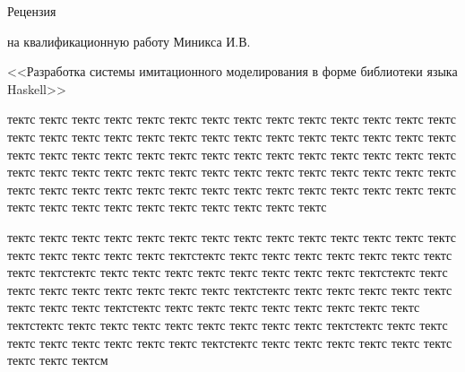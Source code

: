 \documentclass[utf8x]{article}
\begin{document}
\begin{center}
Рецензия

на квалификационную работу Миникса И.В.

<<Разработка системы имитационного моделирования в форме библиотеки языка Haskell>>

\end{center}

тектс тектс тектс тектс тектс тектс тектс тектс тектс тектс тектс тектс тектс тектс тектс тектс тектс тектс тектс тектс тектс тектс тектс тектс тектс тектс тектс тектс тектс тектс тектс тектс тектс тектс тектс тектс тектс тектс тектс тектс тектс тектс тектс тектс тектс тектс тектс тектс тектс тектс тектс тектс тектс тектс тектс тектс тектс тектс тектс тектс тектс тектс тектс тектс тектс тектс тектс тектс тектс тектс
тектс тектс тектс тектс тектс тектс тектс тектс тектс тектс

тектс тектс тектс тектс тектс тектс тектс тектс тектс тектс тектс тектс тектс тектс тектс тектс тектс тектс тектс тектстектс тектс тектс тектс тектс тектс тектс тектс тектс тектстектс тектс тектс тектс тектс тектс тектс тектс тектс тектстектс тектс тектс тектс тектс тектс тектс тектс тектс тектстектс тектс тектс тектс тектс тектс тектс тектс тектс тектстектс тектс тектс тектс тектс тектс тектс тектс тектс тектстектс тектс тектс тектс тектс тектс тектс тектс тектс тектстектс тектс тектс тектс тектс тектс тектс тектс тектс тектстектс тектс тектс тектс тектс тектс тектс тектс тектс тектсм
\end{document}
